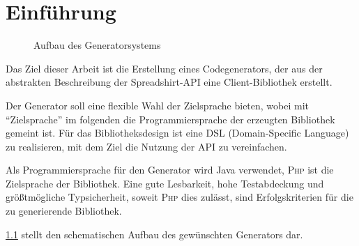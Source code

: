  \chapter{Einführung}
\label{chap:introduction}


\begin{figure}[b]
    \centering
    \resizebox{\textwidth}{!}{
        
    }
    \caption{Aufbau des Generatorsystems}
    \label{fig:generatorstructure}
\end{figure}        

Das Ziel dieser Arbeit ist die Erstellung eines Codegenerators, der aus der abstrakten Beschreibung der Spreadshirt-\gls{API} eine Client-Bibliothek erstellt.

Der Generator soll eine flexible Wahl der Zielsprache bieten, wobei mit \enquote{Zielsprache} im folgenden die Programmiersprache der erzeugten Bibliothek gemeint ist. 
Für das Bibliotheksdesign ist eine \gls{DSL} (Domain-Specific Language) zu realisieren, mit dem Ziel die Nutzung der \gls{API} zu vereinfachen. 

Als Programmiersprache für den Generator wird Java verwendet, \textsc{Php} ist die Zielsprache der Bibliothek.
Eine gute Lesbarkeit, hohe Testabdeckung und größtmögliche Typsicherheit, soweit \textsc{Php} dies zulässt, sind Erfolgskriterien für die zu generierende Bibliothek.

\cref{fig:generatorstructure} stellt den schematischen Aufbau des gewünschten Generators dar.



